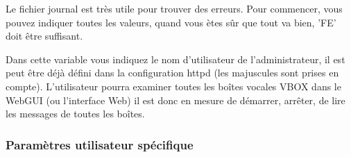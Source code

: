 \begin{description}
    Le fichier journal est très utile pour trouver des erreurs. Pour commencer, vous pouvez
	indiquer toutes les valeurs, quand vous ètes sûr que tout va bien, 'FE' doit être suffisant. 


    Dans cette variable vous indiquez le nom d'utilisateur de l'administrateur, il est peut être
	déjà défini dans la configuration httpd (les majuscules sont prises en compte). L'utilisateur
	pourra examiner toutes les boîtes vocales VBOX dans le WebGUI (ou l'interface Web) il est donc
	en mesure de démarrer, arrêter, de lire les messages de toutes les boîtes.


\end{description}

\subsubsection{Paramètres utilisateur spécifique}

